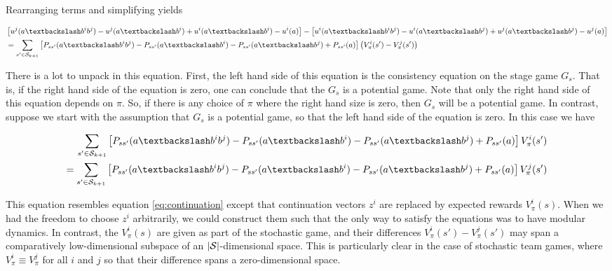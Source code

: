Rearranging terms and simplifying yields

\begin{align*}
&\left[ u^j(\asub{a}{b^ib^j}) - u^j(\asub{a}{b^i}) + u^i(\asub{a}{b^i}) - u^i(a) \right] - \left[ u^i(\asub{a}{b^ib^j}) - u^i(\asub{a}{b^j}) + u^j(\asub{a}{b^j}) - u^j(a) \right] \\
& =  \sum_{s' \in \SS_{k+1}} \left[P_{ss'}(\asub{a}{b^ib^j})- P_{ss'}(\asub{a}{b^i}) - P_{ss'}(\asub{a}{b^j}) +  P_{ss'}(a)\right] \left( V^i_{\pi}(s') - V^j_{\pi}(s') \right)
\label{eq:sgpg}
\end{align*}


There is a lot to unpack in this equation. First, the left hand side of this equation is the consistency equation on the stage game $G_s$. That is, if the right hand side of the equation is zero, one can conclude that the $G_s$ is a potential game. Note that only the right hand side of this equation depends on $\pi$. So, if there is any choice of $\pi$ where the right hand size is zero, then $G_s$ will be a potential game. In contrast, suppose we start with the assumption that $G_s$ is a potential game, so that the left hand side of the equation is zero. In this case we have


\begin{eqnarray*}
\sum_{s' \in \SS_{k+1}} \left[P_{ss'}(\asub{a}{b^ib^j})- P_{ss'}(\asub{a}{b^i}) - P_{ss'}(\asub{a}{b^j}) +  P_{ss'}(a)\right] V^i_{\pi}(s') \\
= \sum_{s' \in \SS_{k+1}} \left[P_{ss'}(\asub{a}{b^ib^j}) - P_{ss'}(\asub{a}{b^i}) - P_{ss'}(\asub{a}{b^j}) +  P_{ss'}(a)\right] V^j_{\pi}(s')
\label{eq:gpgcons}
\end{eqnarray*}


This equation resembles equation \ref{eq:continuation} except that continuation vectors $z^i$ are replaced by expected rewards $V^i_{\pi}(s)$. When we had the freedom to choose $z^i$ arbitrarily, we could construct them such that the only way to satisfy the equations was to have modular dynamics. In contrast, the $V^i_{\pi}(s)$ are given as part of the stochastic game, and their differences $V^i_{\pi}(s') - V^j_{\pi}(s')$ may span a comparatively low-dimensional subspace of an $|\mathcal{S}|$-dimensional space. This is particularly clear in the case of stochastic team games, where $V^i_{\pi} \equiv V^j_{\pi}$ for all $i$ and $j$ so that their difference spans a zero-dimensional space. 



